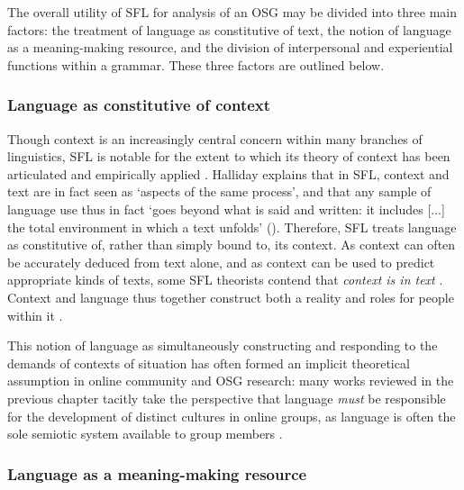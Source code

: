 
The overall utility of \gls{SFL} for analysis of an \gls{OSG} may be divided into three main factors: the treatment of language as constitutive of text, the notion of language as a meaning\hyp{}making resource, and the division of interpersonal and experiential functions within a grammar. These three factors are outlined below.

\subsubsection{Language as constitutive of context} \label{sect:context-in-text}

Though context is an increasingly central concern within many branches of linguistics, \gls{SFL} is notable for the extent to which its theory of context has been articulated and empirically applied \cite{widdowson_text_2008}. Halliday explains that in \gls{SFL}, context and text are in fact seen as `aspects of the same process', and that any sample of language use thus in fact `goes beyond what is said and written: it includes [...] the total environment in which a text unfolds' (\citeyear[p.~5]{halliday_language_1989}). Therefore, \gls{SFL} treats language as constitutive of, rather than simply bound to, its context. As context can often be accurately deduced from text alone, and as context can be used to predict appropriate kinds of texts, some \gls{SFL} theorists contend that \emph{context is in text} \cite[e.g.][p.~7]{eggins_introduction_2004}. Context and language thus together construct both a reality and roles for people within it \cite{veel_learning_1997}.

This notion of language as simultaneously constructing and responding to the demands of contexts of situation has often formed an implicit theoretical assumption in online community and \gls{OSG} research: many works reviewed in the previous chapter tacitly take the perspective that language \emph{must} be responsible for the development of distinct cultures in online groups, as language is often the sole semiotic system available to group members \cite{thorne_computer-mediated_2008}.


\subsubsection{Language as a meaning-making resource}

